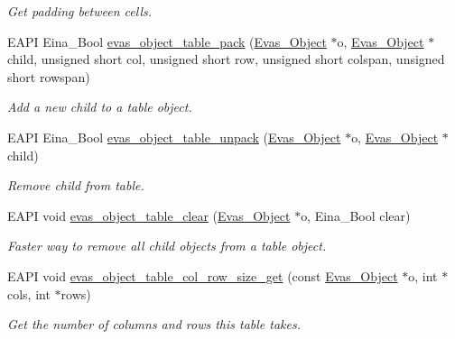 \begin{DoxyCompactItemize}
\begin{DoxyCompactList}\small\item\em Get padding between cells. \item\end{DoxyCompactList}\item 
EAPI Eina\_\-Bool \hyperlink{group__Evas__Object__Table_ga6c1129dcd7509ebde06cf753cf6a681d}{evas\_\-object\_\-table\_\-pack} (\hyperlink{group__Evas__Object__Group_ga9e19e6dd1f517a0ba437c0114d3e7c97}{Evas\_\-Object} $\ast$o, \hyperlink{group__Evas__Object__Group_ga9e19e6dd1f517a0ba437c0114d3e7c97}{Evas\_\-Object} $\ast$child, unsigned short col, unsigned short row, unsigned short colspan, unsigned short rowspan)
\begin{DoxyCompactList}\small\item\em Add a new child to a table object. \item\end{DoxyCompactList}\item 
EAPI Eina\_\-Bool \hyperlink{group__Evas__Object__Table_gac8b800b8a8f38589eae4b979ffc2d598}{evas\_\-object\_\-table\_\-unpack} (\hyperlink{group__Evas__Object__Group_ga9e19e6dd1f517a0ba437c0114d3e7c97}{Evas\_\-Object} $\ast$o, \hyperlink{group__Evas__Object__Group_ga9e19e6dd1f517a0ba437c0114d3e7c97}{Evas\_\-Object} $\ast$child)
\begin{DoxyCompactList}\small\item\em Remove child from table. \item\end{DoxyCompactList}\item 
EAPI void \hyperlink{group__Evas__Object__Table_gaec5a10416b76102f7e22c7b799bfac04}{evas\_\-object\_\-table\_\-clear} (\hyperlink{group__Evas__Object__Group_ga9e19e6dd1f517a0ba437c0114d3e7c97}{Evas\_\-Object} $\ast$o, Eina\_\-Bool clear)
\begin{DoxyCompactList}\small\item\em Faster way to remove all child objects from a table object. \item\end{DoxyCompactList}\item 
EAPI void \hyperlink{group__Evas__Object__Table_ga007c88dba9eb3b326aa67a10c143f3a9}{evas\_\-object\_\-table\_\-col\_\-row\_\-size\_\-get} (const \hyperlink{group__Evas__Object__Group_ga9e19e6dd1f517a0ba437c0114d3e7c97}{Evas\_\-Object} $\ast$o, int $\ast$cols, int $\ast$rows)
\begin{DoxyCompactList}\small\item\em Get the number of columns and rows this table takes. \item\end{DoxyCompactList}\item 

\end{DoxyCompactItemize}
